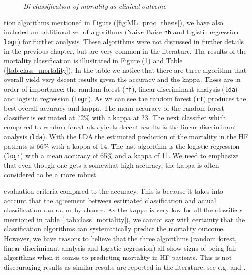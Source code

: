 \documentclass[../thesis.tex]{subfiles}
\begin{document}
\begin{figure}[h!]
    \centering
    \scalebox{.8}{}
    \caption[Bi-classification of mortality as clinical outcome]{\textit{Bi-classification of mortality as clinical outcome}}
    \label{fig:bi_class_mort}
\end{figure}

\noindent tion algorithms mentioned in Figure (\ref{fig:ML_proc_thesis}), we have also included an additional set of algorithms (Naive Baise \texttt{nb} and logistic regression \texttt{logr}) for further analysis. These algorithms were not discussed in further details in the previous chapter, but are very common in the literature. The results of the mortality classification is illustrated in Figure (\ref{fig:bi_class_mort}) and Table (\ref{tab:class_mortality}). In the table we notice that there are three algorithm that overall yield very decent results given the accuracy and the kappa. These are in order of importance: the random forest (\texttt{rf}), linear discriminant analysis (\texttt{lda}) and logistic regression (\texttt{logr}). As we can see the random forest (\texttt{rf}) \citep{ho1995random} produces the best overall accuracy and kappa. The mean accuracy of the random forest classifier is estimated at 72\% with a kappa at 23. The next classifier which compared to random forest also yields decent results is the linear discriminant analysis (\texttt{lda}). With the LDA the estimated prediction of the mortality in the HF patients is 66\% with a kappa of 14. The last algorithm is the logistic regression (\texttt{logr}) with a mean accuracy of 65\% and a kappa of 11. We need to emphasize that even though one gets a somewhat high accuracy, the kappa is often considered to be a more robust  



\noindent evaluation criteria compared to the accuracy. This is because it takes into account that the agreement between estimated classification and actual classification can occur by chance. As the kappa is very low for all the classifiers mentioned in table (\ref{tab:class_mortality}), we cannot say with certainty that the classification algorithms can systematically predict the mortality outcome. However, we have reasons to believe that the three algorithms (random forest, linear discriminant analysis and logistic regression) all show signs of being fair algorithms when it comes to predicting mortality in HF patients. This is not discouraging results as similar results are reported in the literature, see e.g. \cite{shah2014phenomapping} and \cite{panahiazar2015using}.
\end{document}
